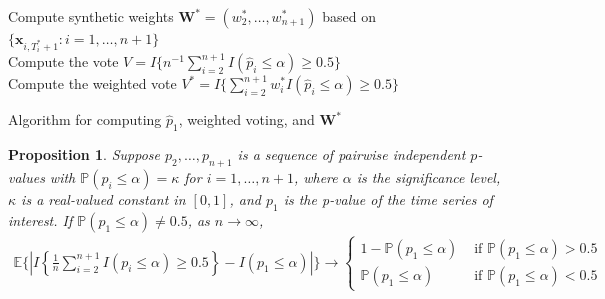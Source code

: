 \documentclass[11pt]{article}
\def\mbf#1{\mathbf{#1}} %
\def\E{\mathbb{E}} %
\def\P{\mathbb{P}}
\newtheorem{prop}{Proposition}
\theoremstyle{definition}
\begin{document}
\begin{algorithm}
 	Compute synthetic weights $\mbf{W}^*= (w_2^*, \ldots, w_{n+1}^*)$ based on $\{\mbf{x}_{i, T_i^*+1}\colon i = 1, \ldots, n+1\}$ \\
 	Compute the vote $V= I\Big\{n^{-1}\sum_{i=2}^{n+1}I(\hat{p}_i \leq  \alpha) \geq 0.5\Big\}$ \\
 	Compute the weighted vote $V^*= I\Big\{ \sum_{i=2}^{n+1}w_i^*I(\hat{p}_i \leq  \alpha) \geq 0.5\Big\}$ 
 	
 \caption{Algorithm for computing $\hat{p}_1$, weighted voting, and $\mbf{W}^*$}\label{Bu}
\end{algorithm}


\begin{prop}
\label{votprop}Suppose $p_2, \ldots, p_{n+1}$ is  a sequence of pairwise independent $p$-values  with $\P(p_i \leq \alpha)=\kappa$ for $i = 1, \ldots, n+1$, where $\alpha$ is the significance level, $\kappa$ is a real-valued constant in $[0,1]$, and  $p_1$ is the p-value of the time series of interest. If $\P(p_1 \leq \alpha) \neq 0.5$,  as $n\to \infty$, 
\begin{align*}
  \E \bigg\{\left|I\left\{\frac{1}{n}\sum_{i=2}^{n+1}I(p_i \leq  \alpha) \geq 0.5\right\}
  - I( p_1 \leq  \alpha) \right|\bigg\}
  \to  \begin{cases}
    1- \P(p_1 \leq \alpha) & \text{ if } \P(p_1 \leq \alpha) > 0.5 \\
    \P(p_1 \leq \alpha) & \text{ if } \P(p_1 \leq \alpha) < 0.5 
  \end{cases}
\end{align*}
\end{prop}
\end{document}
